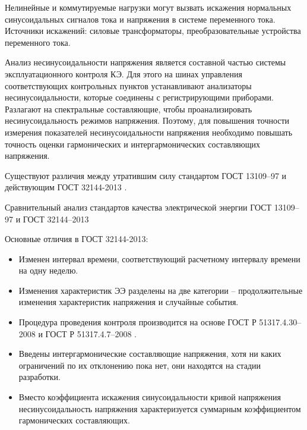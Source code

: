 Нелинейные и коммутируемые нагрузки могут вызвать искажения нормальных синусоидальных сигналов тока и напряжения в системе переменного тока. Источники искажений: силовые трансформаторы, преобразовательные устройства переменного тока.

Анализ несинусоидальности напряжения является составной частью системы эксплуатационного контроля КЭ. Для этого на шинах управления соответствующих контрольных пунктов устанавливают анализаторы несинусоидальности, которые соединены с регистрирующими приборами. Разлагают на спектральные составляющие, чтобы проанализировать несинусоидальность режимов напряжения. Поэтому, для повышения точности измерения показателей несинусоидальности напряжения необходимо повышать точность оценки гармонических и интергармонических составляющих напряжения. 

Существуют различия между утратившим силу стандартом ГОСТ 13109–97 \cite{ГОСТ13109-97} и действующим ГОСТ 32144-2013 \cite{ГОСТ32144-2013}.

Сравнительный анализ стандартов качества электрической энергии ГОСТ 13109–97 и ГОСТ 32144–2013 \cite[с.~155]{Киселёв}


Основные отличия в ГОСТ 32144-2013:
\begin{itemize}
	\item Изменен интервал времени, соответствующий расчетному интервалу времени на одну неделю.
	\item Изменения характеристик ЭЭ разделены на две категории – продолжительные изменения характеристик напряжения и случайные события.
	\item Процедура проведения контроля производится на основе ГОСТ Р 51317.4.30–2008 \cite{ГОСТР51317.4.30-2008} и ГОСТ Р 51317.4.7–2008 \cite{ГОСТР51317.4.7-2008}.
	\item Введены интергармонические составляющие напряжения, хотя ни каких ограничений по их отклонению пока нет, они находятся на стадии разработки.
	\item Вместо коэффициента искажения синусоидальности кривой напряжения несинусоидальность напряжения характеризуется суммарным коэффициентом гармонических составляющих.
\end{itemize} 


